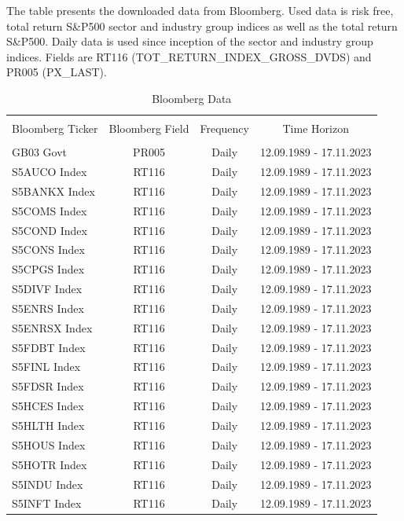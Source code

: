 \documentclass[a4paper,12pt,twoside]{article}
\begin{document}
\begin{table}[H]
\caption{Bloomberg Data}
    The table presents the downloaded data from Bloomberg. Used data is risk free, total return S\&P500 sector and industry group indices as well as the total return S\&P500. Daily data is used since inception of the sector and industry group indices. Fields are RT116 (TOT\_RETURN\_INDEX\_GROSS\_DVDS) and PR005 (PX\_LAST).
\begin{tabular}{@{\extracolsep{12pt}} lccc}
\\[-1.8ex]\hline
\hline \\[-1.8ex]
Bloomberg Ticker & Bloomberg Field & Frequency & Time Horizon \\ 
\hline \\[-1.8ex]
GB03 Govt & PR005 & Daily & 12.09.1989 - 17.11.2023 \\
S5AUCO Index & RT116 & Daily & 12.09.1989 - 17.11.2023 \\
S5BANKX Index & RT116 & Daily & 12.09.1989 - 17.11.2023 \\
S5COMS Index & RT116 & Daily & 12.09.1989 - 17.11.2023 \\
S5COND Index & RT116 & Daily & 12.09.1989 - 17.11.2023 \\
S5CONS Index & RT116 & Daily & 12.09.1989 - 17.11.2023 \\
S5CPGS Index & RT116 & Daily & 12.09.1989 - 17.11.2023 \\
S5DIVF Index & RT116 & Daily & 12.09.1989 - 17.11.2023 \\
S5ENRS Index & RT116 & Daily & 12.09.1989 - 17.11.2023 \\
S5ENRSX Index & RT116 & Daily & 12.09.1989 - 17.11.2023 \\
S5FDBT Index & RT116 & Daily & 12.09.1989 - 17.11.2023 \\
S5FINL Index & RT116 & Daily & 12.09.1989 - 17.11.2023 \\
S5FDSR Index & RT116 & Daily & 12.09.1989 - 17.11.2023 \\
S5HCES Index & RT116 & Daily & 12.09.1989 - 17.11.2023 \\
S5HLTH Index & RT116 & Daily & 12.09.1989 - 17.11.2023 \\
S5HOUS Index & RT116 & Daily & 12.09.1989 - 17.11.2023 \\
S5HOTR Index & RT116 & Daily & 12.09.1989 - 17.11.2023 \\
S5INDU Index & RT116 & Daily & 12.09.1989 - 17.11.2023 \\
S5INFT Index & RT116 & Daily & 12.09.1989 - 17.11.2023 \\

\end{tabular}
\end{table}
\end{document}
